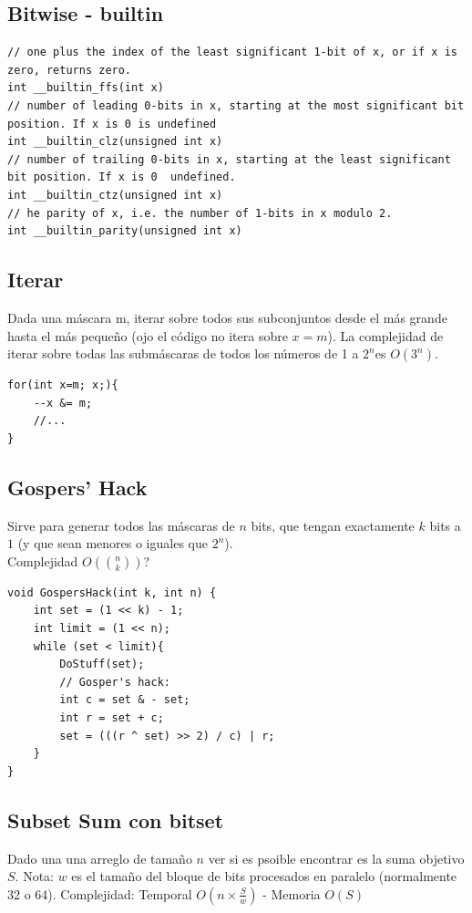 \documentclass[10pt,spanish,mexico]{article}
\numberwithin{equation}{section}
\newcommand{\pa}[1]{\left( #1 \right)}
\begin{document}
\begin{multicols}{2}
\vspace{-0.7\baselineskip}
\hrulefill
\subsection{Bitwise - builtin}
\begin{verbatim}
// one plus the index of the least significant 1-bit of x, or if x is zero, returns zero.
int __builtin_ffs(int x)
// number of leading 0-bits in x, starting at the most significant bit position. If x is 0 is undefined
int __builtin_clz(unsigned int x)
// number of trailing 0-bits in x, starting at the least significant bit position. If x is 0  undefined.
int __builtin_ctz(unsigned int x)
// he parity of x, i.e. the number of 1-bits in x modulo 2.
int __builtin_parity(unsigned int x)
\end{verbatim}

\vspace{-1.2\baselineskip}
\hrulefill
\subsection{Iterar}
Dada una máscara m, iterar sobre todos sus subconjuntos desde el más grande hasta el más pequeño (ojo el código no itera sobre $x=m$). La complejidad de iterar sobre todas las submáscaras de todos los números de 1 a $2^n $es $O(3^n)$.
\begin{verbatim}
for(int x=m; x;){
    --x &= m;
    //...
}
\end{verbatim}

\vspace{-1.2\baselineskip}
\hrulefill
\subsection{Gospers’ Hack}
Sirve para generar todos las máscaras de $n$ bits, que tengan exactamente $k$ bits a $1$ (y que sean menores o iguales que $2^n$). \\
Complejidad $O\pa{\binom{n}{k}}$?
\begin{verbatim}
void GospersHack(int k, int n) {
    int set = (1 << k) - 1;
    int limit = (1 << n);
    while (set < limit){
        DoStuff(set);
        // Gosper's hack:
        int c = set & - set;
        int r = set + c;
        set = (((r ^ set) >> 2) / c) | r;
    }
}
\end{verbatim}

\vspace{-1.2\baselineskip}
\hrulefill
\subsection{Subset Sum con bitset}
Dado una una arreglo de tamaño \(n\) ver si es psoible encontrar es la suma objetivo  \(S\). Nota: \(w\) es el tamaño del bloque de bits procesados en paralelo (normalmente 32 o 64). Complejidad:  Temporal \(O\left(n \times \frac{S}{w}\right)\) -  Memoria \(O(S)\)


\end{multicols}
\end{document}
